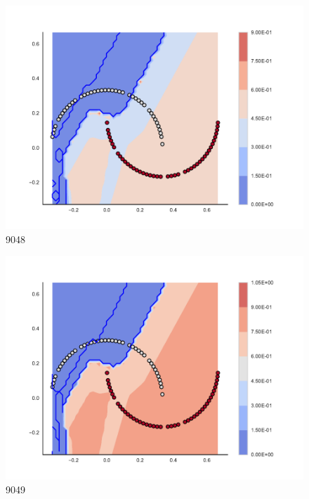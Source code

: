 \begin{subfigure}[b]{0.09\textwidth}
    \includegraphics[clip, trim=2.35cm 1.75cm 4.5cm 0cm,width=\textwidth]{img/convergence/9048.pdf}
    \caption{9048}
    \label{fig:convergence_9048}
\end{subfigure}
%
\begin{subfigure}[b]{0.09\textwidth}
    \includegraphics[clip, trim=2.35cm 1.75cm 4.5cm 0cm,width=\textwidth]{img/convergence/9049.pdf}
    \caption{9049}
    \label{fig:convergence_9049}
\end{subfigure}
%
